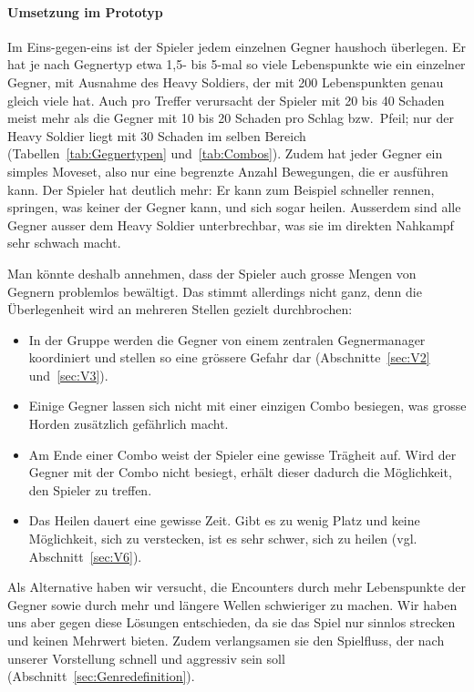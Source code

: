 \documentclass[../Main.tex]{subfiles}
\begin{document}
\paragraph{Umsetzung im Prototyp}
Im Eins-gegen-eins ist der Spieler jedem einzelnen Gegner haushoch überlegen. Er hat je nach Gegnertyp etwa 1,5- bis 5-mal so viele Lebenspunkte wie ein einzelner Gegner, mit Ausnahme des Heavy Soldiers, der mit 200 Lebenspunkten genau gleich viele hat. Auch pro Treffer verursacht der Spieler mit 20 bis 40 Schaden meist mehr als die Gegner mit 10 bis 20 Schaden pro Schlag bzw.\ Pfeil; nur der Heavy Soldier liegt mit 30 Schaden im selben Bereich (Tabellen~\ref{tab:Gegnertypen} und~\ref{tab:Combos}). Zudem hat jeder Gegner ein simples Moveset, also nur eine begrenzte Anzahl Bewegungen, die er ausführen kann. Der Spieler hat deutlich mehr: Er kann zum Beispiel schneller rennen, springen, was keiner der Gegner kann, und sich sogar heilen. Ausserdem sind alle Gegner ausser dem Heavy Soldier unterbrechbar, was sie im direkten Nahkampf sehr schwach macht.

Man könnte deshalb annehmen, dass der Spieler auch grosse Mengen von Gegnern problemlos bewältigt. Das stimmt allerdings nicht ganz, denn die Überlegenheit wird an mehreren Stellen gezielt durchbrochen:

\begin{itemize}[leftmargin=1.5cm]
    \item In der Gruppe werden die Gegner von einem zentralen Gegnermanager koordiniert und stellen so eine grössere Gefahr dar (Abschnitte~\ref{sec:V2} und~\ref{sec:V3}).
    \item Einige Gegner lassen sich nicht mit einer einzigen Combo besiegen, was grosse Horden zusätzlich gefährlich macht.
    \item Am Ende einer Combo weist der Spieler eine gewisse Trägheit auf. Wird der Gegner mit der Combo nicht besiegt, erhält dieser dadurch die Möglichkeit, den Spieler zu treffen.
    \item Das Heilen dauert eine gewisse Zeit. Gibt es zu wenig Platz und keine Möglichkeit, sich zu verstecken, ist es sehr schwer, sich zu heilen (vgl. Abschnitt~\ref{sec:V6}).
\end{itemize}

Als Alternative haben wir versucht, die Encounters durch mehr Lebenspunkte der Gegner sowie durch mehr und längere Wellen schwieriger zu machen. Wir haben uns aber gegen diese Lösungen entschieden, da sie das Spiel nur sinnlos strecken und keinen Mehrwert bieten. Zudem verlangsamen sie den Spielfluss, der nach unserer Vorstellung schnell und aggressiv sein soll (Abschnitt~\ref{sec:Genredefinition}).
\end{document}
